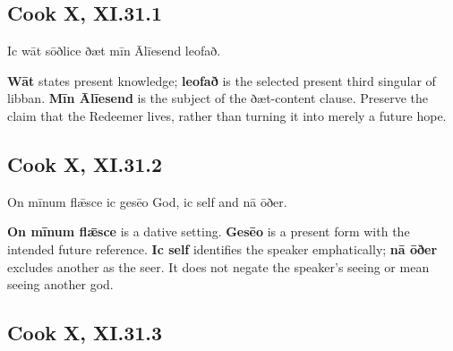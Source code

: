\subsection*{Cook X, XI.31.1}

\par\begin{minipage}{\linewidth}\raggedright
Ic wāt sōðlice ðæt mīn Ālīesend leofað.

\textbf{Wāt} states present knowledge; \textbf{leofað} is the selected present third singular of libban. \textbf{Mīn Ālīesend} is the subject of the ðæt-content clause. Preserve the claim that the Redeemer lives, rather than turning it into merely a future hope.

\end{minipage}\par\addvspace{4pt}

\subsection*{Cook X, XI.31.2}

\par\begin{minipage}{\linewidth}\raggedright
On mīnum flǣsce ic gesēo God, ic self and nā ōðer.

\textbf{On mīnum flǣsce} is a dative setting. \textbf{Gesēo} is a present form with the intended future reference. \textbf{Ic self} identifies the speaker emphatically; \textbf{nā ōðer} excludes another as the seer. It does not negate the speaker’s seeing or mean seeing another god.

\end{minipage}\par\addvspace{4pt}

\subsection*{Cook X, XI.31.3}

